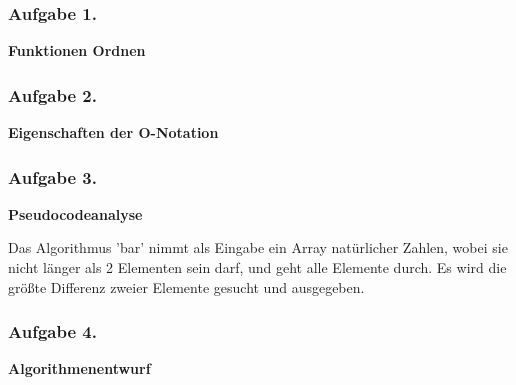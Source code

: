 \documentclass[a4paper,12pt]{article}
\newcommand{\ex}[1]{\newpage\subsubsection*{Aufgabe #1.}}
\begin{document}
	\ex{1}

	\textbf{Funktionen Ordnen}
	\begin{center}
		
	\end{center}

	\ex{2}

	\textbf{Eigenschaften der O-Notation}
	\begin{center}
		
	\end{center}

	\ex{3}

	\textbf{Pseudocodeanalyse}
	\begin{center}
		Das Algorithmus 'bar' nimmt als Eingabe ein Array natürlicher Zahlen, wobei sie nicht länger als 2 Elementen sein darf, und geht alle Elemente durch.
		Es wird die größte Differenz zweier Elemente gesucht und ausgegeben.
	\end{center}

	\ex{4}

	\textbf{Algorithmenentwurf}
	\begin{center}
		
	\end{center}
\end{document}
